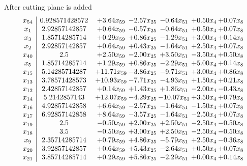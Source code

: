 \documentclass[8pt]{article}
\begin{document}
 After cutting plane is added 
\[\begin{array}{c| c c@{\hskip 2pt} c@{\hskip 2pt} c@{\hskip 2pt} c@{\hskip 2pt} c@{\hskip 2pt} }
 x_{54}   &  0.928571428572 & +  3.64 x_{59} & -2.57 x_{25} & -0.64 x_{51} & +  0.50 x_{4} & +  0.07 x_{8}\\
 x_{1}   &  2.92857142857 & +  0.64 x_{59} & -0.57 x_{25} & -0.64 x_{51} & +  0.50 x_{4} & +  0.07 x_{8}\\
 x_{3}   &  1.85714285714 & +  0.29 x_{59} & +  0.86 x_{25} & -1.29 x_{51} & +  3.00 x_{4} & +  0.14 x_{8}\\
 x_{2}   &  2.92857142857 & +  0.64 x_{59} & +  0.43 x_{25} & -1.64 x_{51} & +  2.50 x_{4} & +  0.07 x_{8}\\
 x_{40}   &  2.5 & +  2.50 x_{59} & -2.00 x_{25} & +  3.50 x_{51} & -3.50 x_{4} & +  0.50 x_{8}\\
 x_{5}   &  1.85714285714 & +  1.29 x_{59} & +  0.86 x_{25} & -2.29 x_{51} & +  5.00 x_{4} & +  0.14 x_{8}\\
 x_{15}   &  5.14285714287 & + 11.71 x_{59} & -3.86 x_{25} & -9.71 x_{51} & +  3.00 x_{4} & +  0.86 x_{8}\\
 x_{13}   &  3.78571428573 & + 10.93 x_{59} & -7.71 x_{25} & -4.93 x_{51} & +  1.50 x_{4} & +  0.21 x_{8}\\
 x_{12}   &  2.42857142857 & +  0.14 x_{59} & +  1.43 x_{25} & +  1.86 x_{51} & -2.00 x_{4} & -0.43 x_{8}\\
 x_{14}   &  5.2142857143 & + 12.07 x_{59} & -4.29 x_{25} & -10.07 x_{51} & +  3.50 x_{4} & +  0.79 x_{8}\\
 x_{16}   &  4.92857142858 & +  6.64 x_{59} & -2.57 x_{25} & -1.64 x_{51} & -1.50 x_{4} & +  0.07 x_{8}\\
 x_{17}   &  6.92857142858 & +  8.64 x_{59} & -3.57 x_{25} & -1.64 x_{51} & -2.50 x_{4} & +  0.07 x_{8}\\
 x_{19}   &  2.5 & -0.50 x_{59} & +  2.00 x_{25} & +  2.50 x_{51} & -2.50 x_{4} & -0.50 x_{8}\\
 x_{18}   &  3.5 & -0.50 x_{59} & +  3.00 x_{25} & +  2.50 x_{51} & -2.50 x_{4} & -0.50 x_{8}\\
 x_{9}   &  2.35714285714 & +  0.79 x_{59} & +  4.86 x_{25} & -5.79 x_{51} & +  2.50 x_{4} & -0.36 x_{8}\\
 x_{20}   &  3.92857142857 & +  0.64 x_{59} & +  5.43 x_{25} & -2.64 x_{51} & +  0.50 x_{4} & +  0.07 x_{8}\\
 x_{21}   &  3.85714285714 & +  0.29 x_{59} & +  5.86 x_{25} & -2.29 x_{51} & +  0.00 x_{4} & +  0.14 x_{8}\\

\end{array}\]
\end{document}
